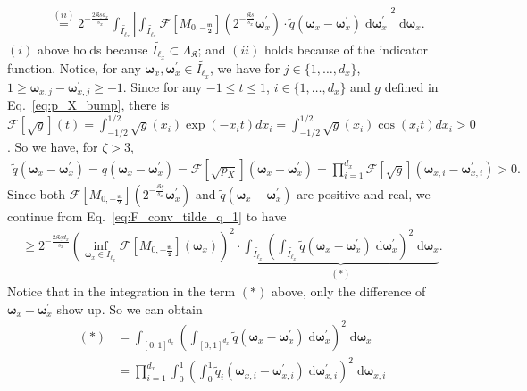 \documentclass[11pt]{article}
\newcommand{\bomega}{\boldsymbol{\omega}}
\newcommand{\calF}{\mathcal{F}}
\newcommand{\bl}{{\boldsymbol\ell}}
\newcommand{\0}{\mathbf{0}}
\begin{document}
\begin{appendix}
\begin{align}
    &\stackrel{(ii)}{=} 2^{-\frac{2\mathfrak{K}\underline{s}d_x}{s_x}} \int_{\tilde{I_{\bl_x}}} \left|\int_{\tilde{I_{\bl_x}}} \calF[M_{0,\boldsymbol{-\frac{\mathfrak{m}}{2}}}]\left(2^{-\frac{\mathfrak{K}\underline{s}}{s_x}} \bomega_x^\prime \right) \cdot \tilde{q}(\bomega_x - \bomega_x^\prime) \;\mathrm{d}\bomega_x^\prime\right|^2 \;\mathrm{d}\bomega_x .
\end{align}
$(i)$ above holds because $\tilde{I_{\bl_x}} \subset \Lambda_\mathfrak{K}$; and $(ii)$ holds because of the indicator function.
Notice, for any $\bomega_x,  \bomega_x^\prime \in \tilde{I_{\bl_x}}$, we have for $j \in \{1, \ldots, d_x\}$, $
1 \geq \bomega_{x, j} - \bomega^\prime_{x, j} \geq -1$. 
Since for any $-1 \leq t \leq 1$, $i \in \{1, \ldots, d_x\}$ and $g$ defined in Eq.~\eqref{eq:p_X_bump}, there is $\calF[\sqrt{g}](t) = \int_{-1/2}^{1/2} \sqrt{g}(x_i) \exp(-x_i t)dx_i = \int_{-1/2}^{1/2} \sqrt{g}(x_i) \cos( x_i t) dx_i > 0$.
So we have, for $\zeta > 3$,
\begin{align*}
    \tilde{q}(\bomega_x - \bomega_x^\prime) = q(\bomega_x - \bomega_x^\prime)= \calF[\sqrt{p_X}](\bomega_x - \bomega_x^\prime) =\prod_{i=1}^{d_x} \calF[\sqrt{g}](\bomega_{x,i} - \bomega^\prime_{x,i}) > 0.
\end{align*}
Since both $\calF[M_{0,\boldsymbol{-\frac{\mathfrak{m}}{2}}}] (2^{-\frac{\mathfrak{K}\underline{s}}{s_x}} \bomega_x^\prime)$ and $\tilde{q}(\bomega_x - \bomega_x^\prime)$ are positive and real, we continue from Eq.~\eqref{eq:F_conv_tilde_q_1} to have
\begin{align*}
    \geq 2^{-\frac{2 \mathfrak{K}\underline{s}d_x}{s_x}} \left( \inf_{\bomega_x \in I_{\bl_x}} \calF[M_{0,\boldsymbol{-\frac{\mathfrak{m}}{2}}}] (\bomega_x) \right)^2 \cdot \underbrace{\int_{\tilde{I_{\bl_x}}} \left( \int_{\tilde{I_{\bl_x}}} \tilde{q}\left( \bomega_x - \bomega_x^{\prime} \right) \;\mathrm{d}\bomega_x^{\prime}  \right)^2 \;\mathrm{d}\bomega_x}_{(\ast)} .
\end{align*}
Notice that in the integration in the term $(\ast)$ above, only the difference of $\bomega_x - \bomega_x^{\prime}$ show up. 
So we can obtain
\begin{align*}
    (\ast) &= \int_{[0,1]^{d_x}} \left( \int_{[0,1]^{d_x}} \tilde{q}\left( \bomega_x - \bomega_x^{\prime} \right) \;\mathrm{d}\bomega_x^{\prime}  \right)^2 \;\mathrm{d}\bomega_x \\
    &= \prod_{i=1}^{d_x} \int_{0}^{1} \left( \int_0^1  \tilde{q}_i\left( \bomega_{x, i} - \bomega_{x, i}^{\prime} \right) \;\mathrm{d}\bomega_{x, i}^{\prime}  \right)^2 \;\mathrm{d}\bomega_{x, i} \\

\end{align*}
\end{appendix}
\end{document}
